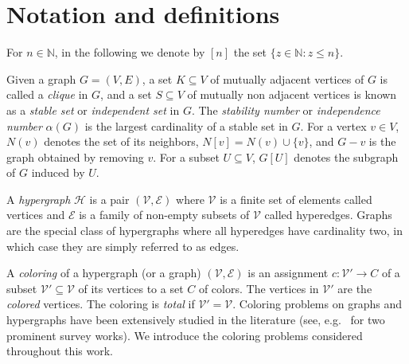 \documentclass[preprint, 11pt, authoryear]{elsarticle}
\newcommand{\hip}{{\mathcal H}}
\newcommand{\VV}{{\mathcal V}}
\newcommand{\EE}{{\mathcal E}}
\newcommand{\N}{{\mathbb N}}
\newcommand{\card}[1]{\left| #1 \right|}
\begin{document}
\section{Notation and definitions}\label{sec.preliminaries}

For $n \in \N$, in the following we denote by $[n]$ the set  $\{z\in \N: z\leq n\}$. 

Given a graph $G=(V,E)$, a set $K \subseteq V$ of mutually adjacent vertices of $G$ is called a \emph{clique} in $G$, and a set $S \subseteq V$ of mutually non adjacent vertices is known as a \emph{stable set} or \emph{independent set} in $G$. The \emph{stability number} or \emph{independence number} $\alpha(G)$ is the largest cardinality of a stable set in $G$.
For a vertex $v \in V$, $N(v)$ denotes the set of its neighbors, $N[v]=N(v)\cup \{v\}$, and $G-v$ is the graph obtained by removing $v$. For a subset $U \subseteq V$, $G[U]$ denotes the subgraph of $G$ induced by $U$.
    
A \textit{hypergraph} $\hip$ is a pair $(\VV, \EE)$ where $\VV$ is a finite set of elements called vertices and $\EE$ is a family of non-empty subsets of $\VV$ called hyperedges. Graphs are the special class of hypergraphs where all hyperedges have cardinality two, in which case they are simply referred to as edges.

A \emph{coloring} of a hypergraph (or a graph) $(\VV, \EE)$ is an assignment $c: \VV' \to C$ of a subset $\VV' \subseteq \VV$ of its vertices to a set $C$ of colors. The vertices in $\VV'$ are the \emph{colored} vertices. The coloring is \emph{total} if  $\VV'=\VV$. 
Coloring problems on graphs and hypergraphs have been extensively studied in the literature (see, e.g.~\cite{JensenToft2011,MalagutiToth2010} for two prominent survey works). 
We introduce the coloring problems considered throughout this work.
\end{document}
